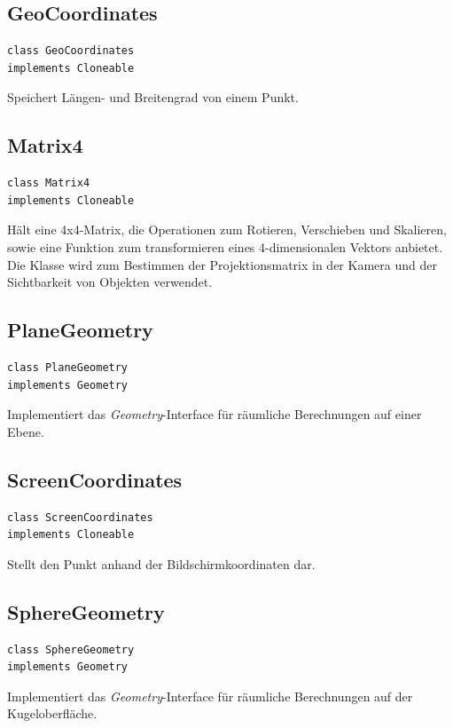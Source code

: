 \documentclass[10pt]{scrreprt}
\begin{document}
\vspace{5mm}
\subsection*{GeoCoordinates}
\begin{lstlisting}
class GeoCoordinates
implements Cloneable
\end{lstlisting}
Speichert Längen- und Breitengrad von einem Punkt.\\

\vspace{5mm}
\subsection*{Matrix4}
\begin{lstlisting}
class Matrix4
implements Cloneable
\end{lstlisting}
Hält eine 4x4-Matrix, die Operationen zum Rotieren, Verschieben und Skalieren, sowie eine Funktion zum transformieren eines 4-dimensionalen Vektors anbietet. Die Klasse wird zum Bestimmen der Projektionsmatrix in der Kamera und der Sichtbarkeit von Objekten verwendet.\\

\vspace{5mm}
\subsection*{PlaneGeometry}
\begin{lstlisting}
class PlaneGeometry
implements Geometry
\end{lstlisting}
Implementiert das \textit{Geometry}-Interface für räumliche Berechnungen auf einer Ebene.\\

\vspace{5mm}
\subsection*{ScreenCoordinates}
\begin{lstlisting}
class ScreenCoordinates
implements Cloneable
\end{lstlisting}
Stellt den Punkt anhand der Bildschirmkoordinaten dar.\\

\newpage
\vspace{5mm}
\subsection*{SphereGeometry}
\begin{lstlisting}
class SphereGeometry
implements Geometry
\end{lstlisting}
Implementiert das \textit{Geometry}-Interface für räumliche Berechnungen auf der Kugeloberfläche.\\
\end{document}
